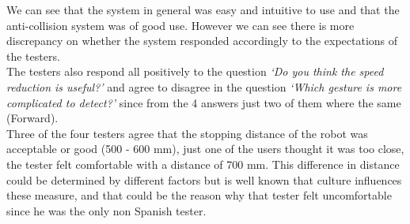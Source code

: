 We can see that the system in general was easy and intuitive to use and that the anti-collision system was of good use. However we can see there is more discrepancy on whether the system responded accordingly to the expectations of the testers.\\

The testers also respond all positively to the question \textit{`Do you think the speed reduction is useful?'} and agree to disagree in the question \textit{`Which gesture is more complicated to detect?'} since from the 4 answers just two of them where the same (Forward).\\

Three of the four testers agree that the stopping distance of the robot was acceptable or good (500 - 600 mm), just one of the users thought it was too close, the tester felt comfortable with a distance of 700 mm. This difference in distance could be determined by different factors but is well known that culture influences these measure, and that could be the reason why that tester felt uncomfortable since he was the only non Spanish tester.

